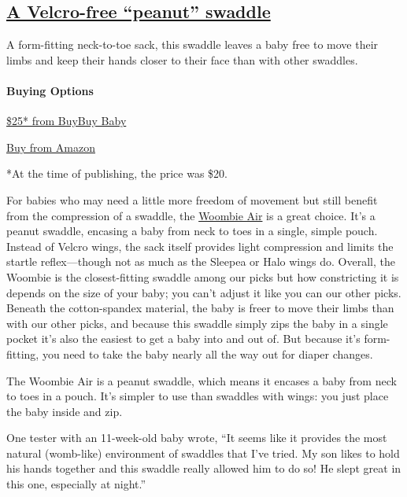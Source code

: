 \hypertarget{a-velcro-free-peanut-swaddle-2}{%
\subsection{\texorpdfstring{\href{https://www.nytimes3xbfgragh.onion/wirecutter/out/link/30688/154051/4/86634?merchant=BuyBuy\%20Baby}{A
Velcro-free ``peanut''
swaddle}}{A Velcro-free ``peanut'' swaddle}}\label{a-velcro-free-peanut-swaddle-2}}

A form-fitting neck-to-toe sack, this swaddle leaves a baby free to move
their limbs and keep their hands closer to their face than with other
swaddles.

\hypertarget{buying-options-8}{%
\paragraph{Buying Options}\label{buying-options-8}}

\href{https://shop-links.co/1715878907105142814}{\$25* from BuyBuy Baby}

\href{https://www.nytimes3xbfgragh.onion/wirecutter/out/link/30688/150979/4/86634?merchant=Amazon}{Buy
from Amazon}

*At the time of publishing, the price was \$20.

For babies who may need a little more freedom of movement but still
benefit from the compression of a swaddle, the
\href{https://www.nytimes3xbfgragh.onion/wirecutter/out/link/30688/154051/4/86649/?merchant=BuyBuy\%20Baby}{Woombie
Air} is a great choice. It's a peanut swaddle, encasing a baby from neck
to toes in a single, simple pouch. Instead of Velcro wings, the sack
itself provides light compression and limits the startle reflex---though
not as much as the Sleepea or Halo wings do. Overall, the Woombie is the
closest-fitting swaddle among our picks but how constricting it is
depends on the size of your baby; you can't adjust it like you can our
other picks. Beneath the cotton-spandex material, the baby is freer to
move their limbs than with our other picks, and because this swaddle
simply zips the baby in a single pocket it's also the easiest to get a
baby into and out of. But because it's form-fitting, you need to take
the baby nearly all the way out for diaper changes.

The Woombie Air is a peanut swaddle, which means it encases a baby from
neck to toes in a pouch. It's simpler to use than swaddles with wings:
you just place the baby inside and zip.

One tester with an 11-week-old baby wrote, ``It seems like it provides
the most natural (womb-like) environment of swaddles that I've tried. My
son likes to hold his hands together and this swaddle really allowed him
to do so! He slept great in this one, especially at night.''

